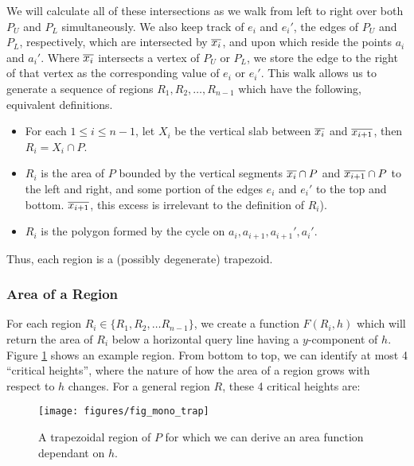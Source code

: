 We will calculate all of these intersections as we walk from left to right over 
both $P_U$ and $P_L$ simultaneously. 
We also keep track of $e_i$ and $e_i'$, the edges of $P_U$ and $P_L$, 
respectively, which are intersected by $\overline{x_i}$, and upon which reside the 
points $a_i$ and $a_i'$. 
Where $\overline{x_i}$ intersects a vertex of $P_U$ or $P_L$, we store the edge to 
the right of that vertex as the corresponding value of $e_i$ or $e_i'$.
This walk allows us to generate a sequence of regions $R_1, R_2, \dots, R_{n-1}$ 
which have the following, equivalent definitions.
\begin{itemize}
 \item For each $1 \leq i \leq n - 1$, let $X_i$ be the vertical slab between 
$\overline{x_i}$ and $\overline{x_{i+1}}$, then $R_i = X_i \cap P$.

 \item $R_i$ is the area of $P$ bounded by the vertical segments $\overline{x_i} 
\cap P$ and $\overline{x_{i+1}} \cap P$ to the left and right, 
 and some portion of the edges $e_i$ and $e_i'$ to the top and bottom. 
$\overline{x_{i+1}}$, this excess is irrelevant to the definition of $R_i$).
 
 \item $R_i$ is the polygon formed by the cycle on $a_i, a_{i+1}, a_{i+1}', 
a_i'$.
\end{itemize}

 
Thus, each region is a (possibly degenerate) trapezoid.


\subsubsection{Area of a Region}
\label{sec:region_area}

For each region $R_i \in \{R_1, R_2, \ldots R_{n-1}\}$, we create a function 
$F(R_i, h)$ which will return the area of $R_i$ below a 
horizontal query line having a $y$-component of $h$.
Figure \ref{fig:monotonep:trapezoid} shows an example region.
From bottom to top, we can identify at most 4 ``critical heights'', where the 
nature of how the area of a region grows with respect to $h$ changes.
For a general region $R$, these 4 critical heights are:

\begin{figure}[t]
\begin{center}
  \texttt{[image: figures/fig\_mono\_trap]}
  \caption[A trapezoidal region of $P$.]{A trapezoidal region of $P$ for which 
we can derive an area function dependant on $h$.}
  \label{fig:monotonep:trapezoid}
\end{center}
\end{figure}

